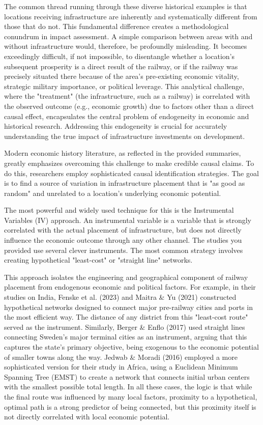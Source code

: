 \documentclass[12pt, a4paper]{article}
\begin{document}
The common thread running through these diverse historical examples is that locations receiving infrastructure are inherently and systematically different from those that do not. This fundamental difference creates a methodological conundrum in impact assessment. A simple comparison between areas with and without infrastructure would, therefore, be profoundly misleading. It becomes exceedingly difficult, if not impossible, to disentangle whether a location's subsequent prosperity is a direct result of the railway, or if the railway was precisely situated there because of the area's pre-existing economic vitality, strategic military importance, or political leverage. This analytical challenge, where the "treatment" (the infrastructure, such as a railway) is correlated with the observed outcome (e.g., economic growth) due to factors other than a direct causal effect, encapsulates the central problem of endogeneity in economic and historical research. Addressing this endogeneity is crucial for accurately understanding the true impact of infrastructure investments on development.


Modern economic history literature, as reflected in the provided summaries, greatly emphasizes overcoming this challenge to make credible causal claims. To do this, researchers employ sophisticated causal identification strategies. The goal is to find a source of variation in infrastructure placement that is "as good as random" and unrelated to a location's underlying economic potential. 

The most powerful and widely used technique for this is the Instrumental Variables (IV) approach. An instrumental variable is a variable that is strongly correlated with the actual placement of infrastructure, but does not directly influence the economic outcome through any other channel. The studies you provided use several clever instruments. The most common strategy involves creating hypothetical "least-cost" or "straight line" networks. 

This approach isolates the engineering and geographical component of railway placement from endogenous economic and political factors. For example, in their studies on India, Fenske et al. (2023) and Maitra \& Yu (2021) constructed hypothetical networks designed to connect major pre-railway cities and ports in the most efficient way. The distance of any district from this "least-cost route" served as the instrument. Similarly, Berger \& Enflo (2017) used straight lines connecting Sweden's major terminal cities as an instrument, arguing that this captures the state's primary objective, being exogenous to the economic potential of smaller towns along the way. Jedwab \& Moradi (2016) employed a more sophisticated version for their study in Africa, using a Euclidean Minimum Spanning Tree (EMST) to create a network that connects initial urban centers with the smallest possible total length. In all these cases, the logic is that while the final route was influenced by many local factors, proximity to a hypothetical, optimal path is a strong predictor of being connected, but this proximity itself is not directly correlated with local economic potential. 
\end{document}
